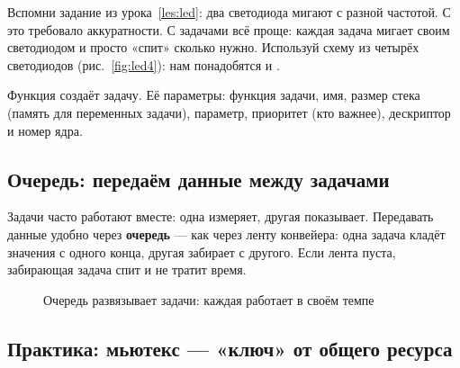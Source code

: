 Вспомни задание из урока~\ref{les:led}: два светодиода мигают с разной частотой. С  это
требовало аккуратности. С задачами всё проще: каждая задача мигает своим светодиодом и просто «спит»
сколько нужно. Используй схему из четырёх светодиодов (рис.~\ref{fig:led4}): нам понадобятся
 и .


Функция  создаёт задачу. Её параметры: функция задачи, имя,
размер стека (память для переменных задачи), параметр, приоритет (кто важнее), дескриптор и номер ядра.

\subsection{Очередь: передаём данные между задачами}

Задачи часто работают вместе: одна измеряет, другая показывает. Передавать данные удобно через
\textbf{очередь} --- как через ленту конвейера: одна задача кладёт значения с одного конца, другая забирает
с другого. Если лента пуста, забирающая задача спит и не тратит время.

\begin{figure}[H]
\centering
{}
\caption{Очередь развязывает задачи: каждая работает в своём темпе}
\end{figure}


\subsection{Практика: мьютекс --- «ключ» от общего ресурса}

